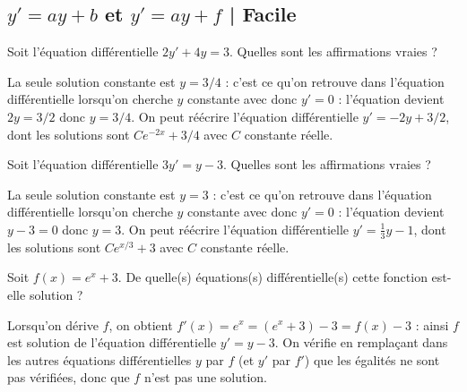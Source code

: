 \subsection{$y'=ay+b$ et $y'=ay+f$ | Facile}

\begin{question}
Soit l'équation différentielle $2y'+4y=3$. Quelles sont les affirmations vraies ?
\begin{answers}
\end{answers}
\begin{explanations}
La seule solution constante est $y=3/4$ : c'est ce qu'on retrouve dans l'équation différentielle lorsqu'on cherche $y$ constante avec donc $y'=0$ : l'équation devient $2y = 3/2$ donc $y = 3/4$.
On peut réécrire l'équation différentielle $y'=-2y+3/2$, dont les solutions sont $C e^{-2x}+3/4$ avec $C$ constante réelle. 
\end{explanations}
\end{question}


\begin{question}
Soit l'équation différentielle $3y'=y-3$. Quelles sont les affirmations vraies ?
\begin{answers}
\end{answers}
\begin{explanations}
La seule solution constante est $y=3$ : c'est ce qu'on retrouve dans l'équation différentielle lorsqu'on cherche $y$ constante avec donc $y'=0$ : l'équation devient $y-3 = 0$ donc $y = 3$. 
On peut réécrire l'équation différentielle $y'=\frac 13y-1$, dont les solutions sont $C e^{x/3}+3$ avec $C$ constante réelle. 
\end{explanations}
\end{question}


\begin{question}
Soit $f(x) = e^x+3$.
De quelle(s) équations(s) différentielle(s) cette fonction est-elle solution ?
\begin{answers}  
\end{answers}
\begin{explanations}
Lorsqu'on dérive $f$, on obtient $f'(x) = e^x = (e^x+3)-3 = f(x) - 3$ : ainsi $f$ est solution de l'équation différentielle $y' = y - 3$. On vérifie en remplaçant dans les autres équations différentielles $y$ par $f$ (et $y'$ par $f'$) que les égalités ne sont pas vérifiées, donc que $f$ n'est pas une solution.
\end{explanations}
\end{question}


